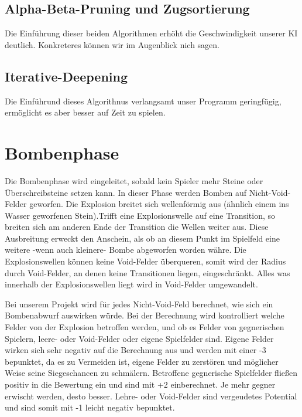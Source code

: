 \documentclass[12pt,a4paper]{article}
\begin{document}
\subsection{Alpha-Beta-Pruning und Zugsortierung}
Die Einführung dieser beiden Algorithmen erhöht die Geschwindigkeit unserer KI deutlich. Konkreteres können wir im Augenblick nich sagen.

\subsection{Iterative-Deepening}
Die Einführund dieses Algorithnus verlangsamt unser Programm geringfügig, ermöglicht es aber besser auf Zeit zu spielen. 
\newpage
\section{Bombenphase}
Die Bombenphase wird eingeleitet, sobald kein Spieler mehr Steine oder Überschreibsteine setzen kann. In dieser Phase werden Bomben auf Nicht-Void-Felder geworfen. Die Explosion breitet sich wellenförmig aus (ähnlich einem ins Wasser geworfenen Stein).Trifft eine Explosionswelle auf eine Transition, so breiten sich am anderen Ende der Transition die Wellen weiter aus. Diese Ausbreitung erweckt den Anschein, als ob an diesem Punkt im Spielfeld eine weitere -wenn auch kleinere- Bombe abgeworfen worden währe. Die Explosionswellen können keine Void-Felder überqueren, somit wird der Radius durch Void-Felder, an denen keine Transitionen liegen, eingeschränkt. Alles was innerhalb der Explosionswellen liegt wird in Void-Felder umgewandelt.

Bei unserem Projekt wird für jedes Nicht-Void-Feld berechnet, wie sich ein Bombenabwurf auswirken würde. Bei der Berechnung wird kontrolliert welche Felder von der Explosion betroffen werden, und ob es Felder von gegnerischen Spielern, leere- oder Void-Felder oder eigene Spielfelder sind. Eigene Felder wirken sich sehr negativ auf die Berechnung aus und werden mit einer -3 bepunktet, da es zu Vermeiden ist, eigene Felder zu zerstören und möglicher Weise seine Siegeschancen zu schmälern. Betroffene gegnerische Spielfelder fließen positiv in die Bewertung ein und sind mit +2 einberechnet. Je mehr gegner erwischt werden, desto besser. Lehre- oder Void-Felder sind vergeudetes Potential und sind somit mit -1 leicht negativ bepunktet.
\end{document}
